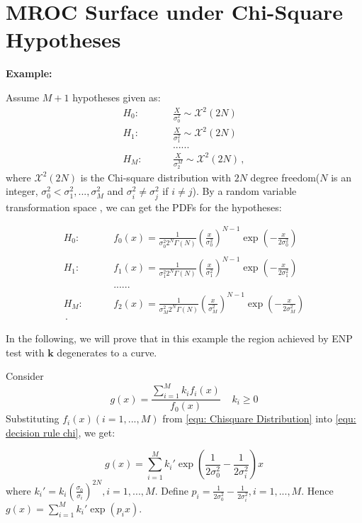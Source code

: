\section{MROC Surface under Chi-Square Hypotheses}
\noindent\textbf{Example:}

Assume $M+1$ hypotheses  given as:
\begin{equation}
  \label{equ: Chisquare Hypothesis}
  \begin{split}
    H_0:\;\;\;\;\;\;\;\;&\frac{X}{\sigma_0^2} \sim \mathcal{X}^2(2N)\\
    H_1:\;\;\;\;\;\;\;\;&\frac{X}{\sigma_1^2} \sim \mathcal{X}^2(2N)\\
    &......\\
    H_M:\;\;\;\;\;\;\;\;&\frac{X}{\sigma_2^M} \sim \mathcal{X}^2(2N)\,,
  \end{split}
\end{equation}
where $\mathcal{X}^2(2N)$ is the Chi-square distribution with  $2N$ degree freedom($N$ is an integer, $\sigma_0^2 < \sigma_1^2, ..., \sigma_M^2$ and $\sigma_i^2 \neq \sigma_j^2$ if $i \neq j$). By a random variable transformation space \cite{mark2011probability}, we can get the PDFs for the hypotheses:

\def \CHISQU[#1]{\frac{1}{#1 2^N\Gamma(N)}\left(\frac{x}{#1}\right)^{N-1}\exp\left(-\frac{x}{2#1}\right)\\}
\begin{equation}
  \label{equ: Chisquare Distribution}
  \begin{split}
    H_0:\;\;\;\;\;\;\;\;&f_0(x) = \CHISQU[\sigma_0^2]\\
    H_1:\;\;\;\;\;\;\;\;&f_1(x) = \CHISQU[\sigma_1^2]\\
    &......\\
    H_M:\;\;\;\;\;\;\;\;&f_2(x) = \CHISQU[\sigma_M^2]\,.
  \end{split}
\end{equation}

In the following, we will prove that in this example the region achieved by ENP test with $\mathbf{k}$ degenerates to a curve.

Consider
\begin{equation}
\label{equ: decision rule chi}
  g(x) = \frac{\sum_{i=1}^{M}k_if_i(x)}{f_0(x)} \;\;\;\;k_i \geq 0
\end{equation}
Substituting $f_i(x) (i=1, ..., M)$ from \eqref{equ: Chisquare Distribution} into \eqref{equ: decision rule chi}, we get:

\begin{equation}
  \label{equ: decision rule chi 1}
g(x) = \sum_{i=1}^{M}k_i'\exp{(\frac{1}{2\sigma_0^2} - \frac{1}{2\sigma_i^2})x} 
\end{equation}
where $k_i' = k_i(\frac{\sigma_0}{\sigma_i})^{2N}, i= 1, ..., M$. Define $p_i = \frac{1}{2\sigma_0^2} - \frac{1}{2\sigma_i^2}, i=1, ..., M$. Hence $g(x) =  \sum_{i=1}^{M}k_i'\exp{(p_ix)}$.


